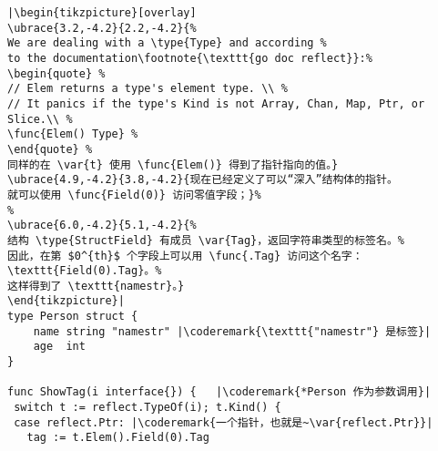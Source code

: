 \begin{lstlisting}[caption=使用反射自省,label=src:introspection]
|\begin{tikzpicture}[overlay]
\ubrace{3.2,-4.2}{2.2,-4.2}{%
We are dealing with a \type{Type} and according %
to the documentation\footnote{\texttt{go doc reflect}}:%
\begin{quote} %
// Elem returns a type's element type. \\ %
// It panics if the type's Kind is not Array, Chan, Map, Ptr, or Slice.\\ %
\func{Elem() Type} %
\end{quote} %
同样的在 \var{t} 使用 \func{Elem()} 得到了指针指向的值。}
\ubrace{4.9,-4.2}{3.8,-4.2}{现在已经定义了可以“深入”结构体的指针。
就可以使用 \func{Field(0)} 访问零值字段；}%
%
\ubrace{6.0,-4.2}{5.1,-4.2}{%
结构 \type{StructField} 有成员 \var{Tag}，返回字符串类型的标签名。%
因此，在第 $0^{th}$ 个字段上可以用 \func{.Tag} 访问这个名字：\texttt{Field(0).Tag}。%
这样得到了 \texttt{namestr}。}
\end{tikzpicture}|
type Person struct {
    name string "namestr" |\coderemark{\texttt{"namestr"} 是标签}|
    age  int
}

func ShowTag(i interface{}) {   |\coderemark{*Person 作为参数调用}|
 switch t := reflect.TypeOf(i); t.Kind() {
 case reflect.Ptr: |\coderemark{一个指针，也就是~\var{reflect.Ptr}}|
   tag := t.Elem().Field(0).Tag
\end{lstlisting}
